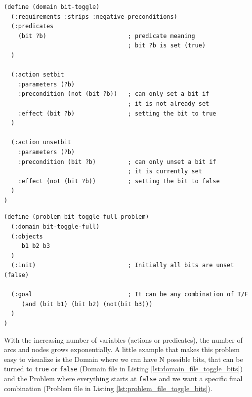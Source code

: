 \vspace{10mm}
\begin{codewindow}
    \begin{lstlisting}
(define (domain bit-toggle)
  (:requirements :strips :negative-preconditions)
  (:predicates
    (bit ?b)                       ; predicate meaning
                                   ; bit ?b is set (true)
  )

  (:action setbit
    :parameters (?b)
    :precondition (not (bit ?b))   ; can only set a bit if
                                   ; it is not already set
    :effect (bit ?b)               ; setting the bit to true
  )

  (:action unsetbit
    :parameters (?b)
    :precondition (bit ?b)         ; can only unset a bit if
                                   ; it is currently set
    :effect (not (bit ?b))         ; setting the bit to false
  )
)

\end{lstlisting}
\end{codewindow}
\vspace{10mm}

\vspace{10mm}
\begin{codewindow}
    \begin{lstlisting}
(define (problem bit-toggle-full-problem)
  (:domain bit-toggle-full)
  (:objects
     b1 b2 b3
  )
  (:init)                          ; Initially all bits are unset (false)

  (:goal                           ; It can be any combination of T/F
     (and (bit b1) (bit b2) (not(bit b3)))
  )
)
\end{lstlisting}
\end{codewindow}
\vspace{10mm}

With the increasing number of variables (actions or predicates), the number of arcs
and nodes grows exponentially. A little example that makes this problem easy to
visualize is the Domain where we can have N possible bits, that can be turned to
\texttt{true} or \texttt{false} (Domain file in Listing
\ref{lst:domain_file_toggle_bits}) and the Problem where everything starts at \texttt{false}
and we want a specific final combination (Problem file in Listing \ref{lst:problem_file_toggle_bits}).

